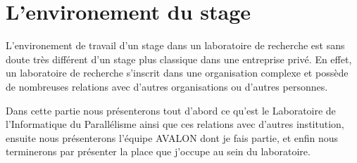 \newpage
\section{L'environement du stage}
L'environement de travail d'un stage dans un laboratoire de recherche est sans doute très différent d'un stage plus classique dans une entreprise privé. En effet, un laboratoire de recherche s'inscrit dans une organisation complexe et possède de nombreuses relations avec d'autres organisations ou d'autres personnes.

Dans cette partie nous présenterons tout d'abord ce qu'est le Laboratoire de l'Informatique du Parallélisme ainsi que ces relations avec d'autres institution, ensuite nous présenterons l'équipe AVALON dont je fais partie, et enfin nous terminerons par présenter la place que j'occupe au sein du laboratoire.



